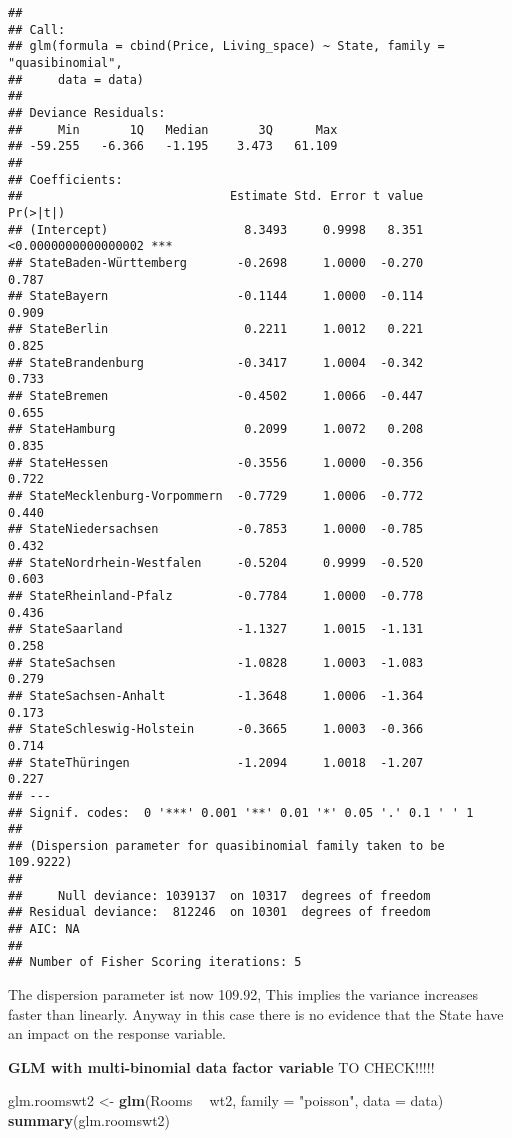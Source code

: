 \documentclass[
]{article}
\newenvironment{Shaded}{\begin{snugshade}}{\end{snugshade}}
\newcommand{\DataTypeTok}[1]{\textcolor[rgb]{0.13,0.29,0.53}{#1}}
\newcommand{\KeywordTok}[1]{\textcolor[rgb]{0.13,0.29,0.53}{\textbf{#1}}}
\newcommand{\NormalTok}[1]{#1}
\newcommand{\OperatorTok}[1]{\textcolor[rgb]{0.81,0.36,0.00}{\textbf{#1}}}
\newcommand{\StringTok}[1]{\textcolor[rgb]{0.31,0.60,0.02}{#1}}
\begin{document}
\begin{verbatim}
## 
## Call:
## glm(formula = cbind(Price, Living_space) ~ State, family = "quasibinomial", 
##     data = data)
## 
## Deviance Residuals: 
##     Min       1Q   Median       3Q      Max  
## -59.255   -6.366   -1.195    3.473   61.109  
## 
## Coefficients:
##                             Estimate Std. Error t value            Pr(>|t|)    
## (Intercept)                   8.3493     0.9998   8.351 <0.0000000000000002 ***
## StateBaden-Württemberg       -0.2698     1.0000  -0.270               0.787    
## StateBayern                  -0.1144     1.0000  -0.114               0.909    
## StateBerlin                   0.2211     1.0012   0.221               0.825    
## StateBrandenburg             -0.3417     1.0004  -0.342               0.733    
## StateBremen                  -0.4502     1.0066  -0.447               0.655    
## StateHamburg                  0.2099     1.0072   0.208               0.835    
## StateHessen                  -0.3556     1.0000  -0.356               0.722    
## StateMecklenburg-Vorpommern  -0.7729     1.0006  -0.772               0.440    
## StateNiedersachsen           -0.7853     1.0000  -0.785               0.432    
## StateNordrhein-Westfalen     -0.5204     0.9999  -0.520               0.603    
## StateRheinland-Pfalz         -0.7784     1.0000  -0.778               0.436    
## StateSaarland                -1.1327     1.0015  -1.131               0.258    
## StateSachsen                 -1.0828     1.0003  -1.083               0.279    
## StateSachsen-Anhalt          -1.3648     1.0006  -1.364               0.173    
## StateSchleswig-Holstein      -0.3665     1.0003  -0.366               0.714    
## StateThüringen               -1.2094     1.0018  -1.207               0.227    
## ---
## Signif. codes:  0 '***' 0.001 '**' 0.01 '*' 0.05 '.' 0.1 ' ' 1
## 
## (Dispersion parameter for quasibinomial family taken to be 109.9222)
## 
##     Null deviance: 1039137  on 10317  degrees of freedom
## Residual deviance:  812246  on 10301  degrees of freedom
## AIC: NA
## 
## Number of Fisher Scoring iterations: 5
\end{verbatim}

The dispersion parameter ist now 109.92, This implies the variance
increases faster than linearly. Anyway in this case there is no evidence
that the State have an impact on the response variable.

\textbf{GLM with multi-binomial data factor variable} TO CHECK!!!!!

\begin{Shaded}
\begin{Highlighting}[]
\NormalTok{glm.roomswt2 <-}\StringTok{ }\KeywordTok{glm}\NormalTok{(Rooms }\OperatorTok{~}\StringTok{ }\NormalTok{wt2,}
\DataTypeTok{family =} \StringTok{"poisson"}\NormalTok{,}
\DataTypeTok{data =}\NormalTok{ data)}
\KeywordTok{summary}\NormalTok{(glm.roomswt2)}
\end{Highlighting}
\end{Shaded}
\end{document}
